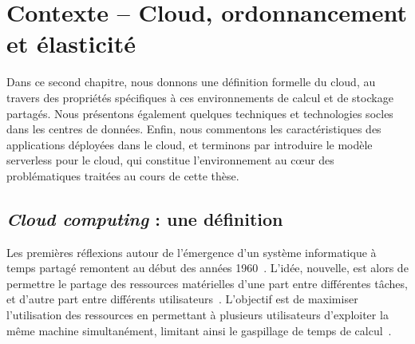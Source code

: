 \clearemptydoublepage
\chapter{Contexte -- Cloud, ordonnancement et élasticité}
\label{chapter:context}

Dans ce second chapitre, nous donnons une définition formelle du cloud, au travers des propriétés spécifiques à ces environnements de calcul et de stockage partagés. Nous présentons également quelques techniques et technologies socles dans les centres de données. Enfin, nous commentons les caractéristiques des applications déployées dans le cloud, et terminons par introduire le modèle serverless pour le cloud, qui constitue l'environnement au cœur des problématiques traitées au cours de cette thèse.

\section{\textit{Cloud computing} : une définition}

Les premières réflexions autour de l'émergence d'un système informatique à temps partagé remontent au début des années 1960~\cite{greenberger1962management}. L'idée, nouvelle, est alors de permettre le partage des ressources matérielles d'une part entre différentes tâches, et d'autre part entre différents utilisateurs~\cite{meyerVirtualMachineTimesharing1970}. L'objectif est de maximiser l'utilisation des ressources en permettant à plusieurs utilisateurs d'exploiter la même machine simultanément, limitant ainsi le gaspillage de temps de calcul~\cite{corbato1962experimental}.

